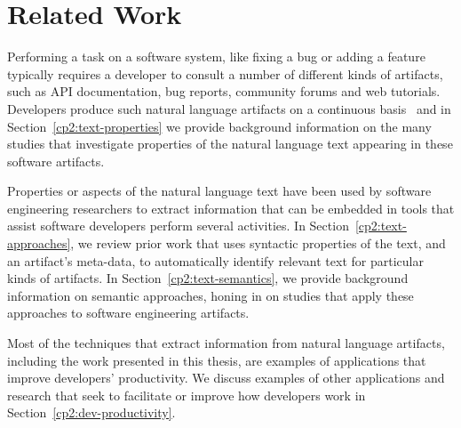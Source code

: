\setcounter{chapter}{1}


\chapter{Related Work}
\label{ch:related-work}








Performing a task on a software system, like fixing a bug
or adding a feature typically requires a developer to consult
a number of different kinds of artifacts, such
as API documentation, bug reports, community forums
and web tutorials. 
Developers produce such natural language artifacts on a 
continuous basis~\cite{Rastkar2013t} 
and in Section~\ref{cp2:text-properties} we  provide background information 
on the many studies that investigate 
properties of the natural language text 
appearing in these software artifacts.





Properties or aspects of the natural language 
text 
have been used 
by software engineering researchers
to extract
information that can be embedded in
tools that assist software developers perform several activities.
In Section~\ref{cp2:text-approaches}, we review 
prior work that uses
syntactic properties of the text, and an artifact's meta-data, 
to automatically identify relevant text for particular kinds of artifacts.
In Section~\ref{cp2:text-semantics},
we provide background information on semantic approaches,
honing in on studies that apply these approaches to 
software engineering artifacts.



Most of the techniques that extract information from natural 
language artifacts, including the work presented in this thesis, are examples of applications that improve developers' productivity. 
We discuss examples of other applications 
and research that seek to facilitate or improve how developers 
work in Section~\ref{cp2:dev-productivity}.








% 








% 
% 
% 